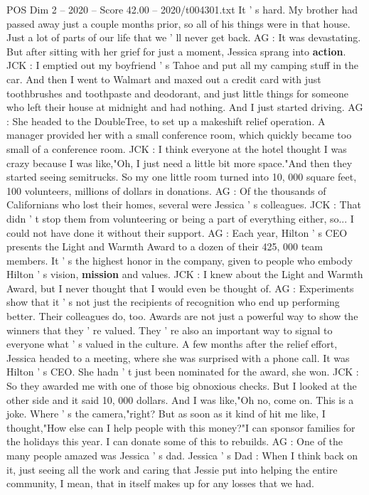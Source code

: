 \begin{textsample}{POS Dim 2 – 2020 – Score 42.00 – 2020/t004301.txt}
It ' s hard.
My brother had passed away just a couple months prior, so all of his things were in that house.
Just a lot of parts of our life that we ' ll never get back.
AG : It was devastating.
But after sitting with her grief for just a moment, Jessica sprang into \textbf{action}.
JCK : I emptied out my boyfriend ' s Tahoe and put all my camping stuff in the car.
And then I went to Walmart and maxed out a credit card with just toothbrushes and toothpaste and deodorant, and just little things for someone who left their house at midnight and had nothing.
And I just started driving.
AG : She headed to the DoubleTree, to set up a makeshift relief operation.
A manager provided her with a small conference room, which quickly became too small of a conference room.
JCK : I think everyone at the hotel thought I was crazy because I was like,"Oh, I just need a little bit more space."And then they started seeing semitrucks.
So my one little room turned into 10, 000 square feet, 100 volunteers, millions of dollars in donations.
AG : Of the thousands of Californians who lost their homes, several were Jessica ' s colleagues.
JCK : That didn ' t stop them from volunteering or being a part of everything either, so...
I could not have done it without their support.
AG : Each year, Hilton ' s CEO presents the Light and Warmth Award to a dozen of their 425, 000 team members.
It ' s the highest honor in the company, given to people who embody Hilton ' s vision, \textbf{mission} and values.
JCK : I knew about the Light and Warmth Award, but I never thought that I would even be thought of.
AG : Experiments show that it ' s not just the recipients of recognition who end up performing better.
Their colleagues do, too.
Awards are not just a powerful way to show the winners that they ' re valued.
They ' re also an important way to signal to everyone what ' s valued in the culture.
A few months after the relief effort, Jessica headed to a meeting, where she was surprised with a phone call.
It was Hilton ' s CEO.
She hadn ' t just been nominated for the award, she won.
JCK : So they awarded me with one of those big obnoxious checks.
But I looked at the other side and it said 10, 000 dollars.
And I was like,"Oh no, come on.
This is a joke.
Where ' s the camera,"right?
But as soon as it kind of hit me like, I thought,"How else can I help people with this money?"I can sponsor families for the holidays this year.
I can donate some of this to rebuilds.
AG : One of the many people amazed was Jessica ' s dad.
Jessica ' s Dad : When I think back on it, just seeing all the work and caring that Jessie put into helping the entire community, I mean, that in itself makes up for any losses that we had.

\end{textsample}
